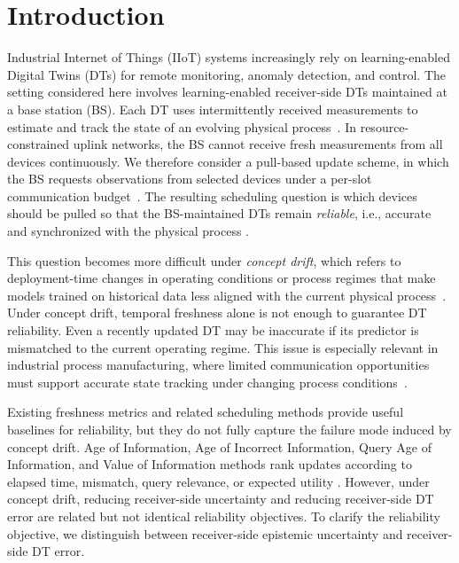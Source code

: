 \documentclass[conference]{IEEEtran}
\begin{document}
\section{Introduction}

Industrial Internet of Things (IIoT) systems increasingly rely on learning-enabled
Digital Twins (DTs) for remote monitoring, anomaly detection, and control. The setting
considered here involves learning-enabled receiver-side DTs maintained at a
base station (BS). Each DT uses intermittently received measurements to
estimate and track the state of an \mbox{evolving} physical process~\cite{tao19,pappas2021semantics}. In resource-constrained uplink networks,
the BS cannot receive fresh measurements from all devices continuously. We
therefore consider a pull-based update scheme, in which the BS requests
observations from selected devices under a per-slot communication budget~\cite{chiariotti2022qaoi, agheli2024eff}. The resulting scheduling question is which devices should be pulled so that
the BS-maintained DTs remain \textit{reliable}, i.e., accurate and synchronized with
the physical process \cite{zhang2024knowledge}.

This question becomes more difficult under \emph{concept drift}, which refers
to deployment-time changes in operating conditions or process regimes that make
models trained on historical data less aligned with the current physical
process~\cite{Lu_18conceptdrift}. Under concept drift, temporal freshness alone is not
enough to guarantee DT reliability. Even a recently updated DT may be inaccurate
if its predictor is mismatched to the current operating regime. This issue is
especially relevant in industrial process manufacturing, where limited communication
\mbox{opportunities} must support accurate state tracking under changing process
conditions~\cite{tao19}.

Existing freshness metrics and related scheduling methods provide useful baselines for reliability, but
they do not fully capture the failure mode induced by concept drift. Age of Information, Age of
Incorrect Information, Query Age of Information, and Value of
Information methods rank updates according to elapsed time, mismatch, query
relevance, or expected utility
\cite{sun2022age,maataouk2020aoii,chiariotti2022qaoi,Molin2019VoI}.
However, under concept drift, reducing receiver-side uncertainty and reducing
receiver-side DT error are related but not identical reliability objectives.
To clarify the reliability objective, we distinguish between receiver-side
epistemic uncertainty and receiver-side DT error. 
\end{document}
